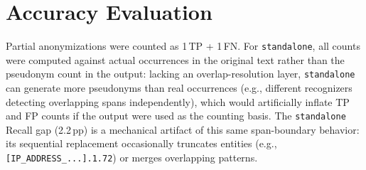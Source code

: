 \documentclass[12pt]{article}
\begin{document}
\section{Accuracy Evaluation}
\label{sec:accuracy_results}

Partial anonymizations were counted as 1\,TP + 1\,FN. For \texttt{standalone}, all counts were computed against actual occurrences in the original text rather than the pseudonym count in the output: lacking an overlap-resolution layer, \texttt{standalone} can generate more pseudonyms than real occurrences (e.g., different recognizers detecting overlapping spans independently), which would artificially inflate TP and FP counts if the output were used as the counting basis. The \texttt{standalone} Recall gap (2.2\,pp) is a mechanical artifact of this same span-boundary behavior: its sequential replacement occasionally truncates entities (e.g., \texttt{[IP\_ADDRESS\_...].1.72}) or merges overlapping patterns.

\begin{table}[!htp]
\centering
\caption{Accuracy on 67-record validation set (D1 OpenVAS CSV).}
\label{tab:accuracy}
\small
{}
\end{table}
\end{document}
